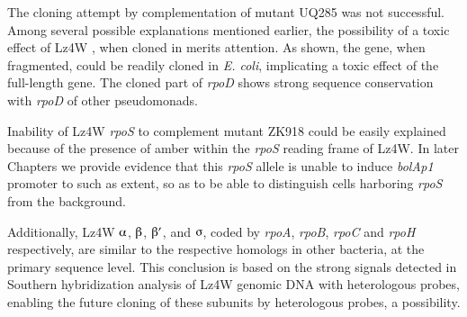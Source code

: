 The cloning attempt by complementation of  
mutant UQ285 was not successful. Among several possible
explanations mentioned earlier, the possibility of a toxic effect
of Lz4W , when cloned in  merits attention. As
shown, the gene, when fragmented, could be readily cloned in
\emph{E. coli}, implicating a toxic effect of the full-length
gene. The cloned part of \emph{rpoD} shows strong sequence
conservation with \emph{rpoD} of other pseudomonads.

Inability of Lz4W \emph{rpoS} to complement  
mutant ZK918 could be easily explained because of the presence of
amber within the \emph{rpoS} reading frame of Lz4W. In later
Chapters we provide evidence that this \emph{rpoS} allele is
unable to induce \emph{bolAp1} promoter to such as extent, so as
to be able to distinguish cells harboring \emph{rpoS} from the
background.

Additionally, Lz4W $\alphaup$, $\betaup$, $\betaup'$, and
$\sigmaup$, coded by \emph{rpoA}, \emph{rpoB}, \emph{rpoC}
and \emph{rpoH} respectively, are  similar to the respective
homologs in other bacteria, at the primary sequence level. This
conclusion is based on the strong signals detected in Southern
hybridization analysis of Lz4W genomic DNA with heterologous
probes, enabling the future cloning of these subunits by
heterologous probes, a possibility.
